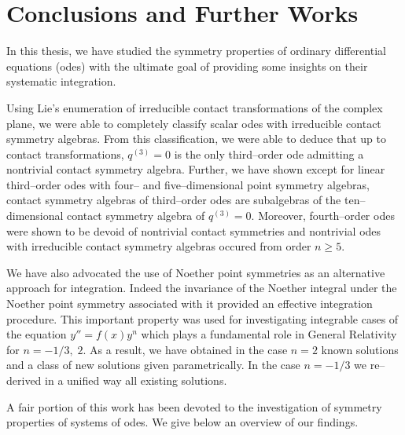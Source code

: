%

\chapter*{Conclusions and Further Works}

In this thesis, we have studied the symmetry properties of
ordinary differential equations (odes) with the ultimate
goal of providing some insights on their systematic integration. 

Using Lie's enumeration of irreducible contact transformations of the complex
plane, we were able to completely classify scalar odes with irreducible
contact symmetry algebras. From this classification, we were able to
deduce that up to
contact transformations, $q^{(3)}=0$ is the only third--order ode admitting
a nontrivial contact symmetry algebra. Further, we have shown except for
linear third--order odes with four-- and  five--dimensional point  symmetry
algebras, contact symmetry algebras of third--order odes are subalgebras of
the
ten--dimensional contact symmetry algebra of $q^{(3)}=0$. Moreover,
fourth--order odes were shown to be devoid of nontrivial contact symmetries
and nontrivial odes with irreducible contact symmetry algebras occured
from order $n \ge 5$. 

We have also advocated the use of Noether point symmetries as an alternative
approach for integration. Indeed the invariance of the Noether integral under
the Noether point symmetry associated with it provided an effective
integration procedure. This important property was used for
investigating integrable cases of the equation $y''=f(x)y^n$ which plays
a fundamental role in General Relativity for $n=-1/3,\;2$.
As a result, we have obtained in the case $n=2$ known solutions and a class
of new solutions given parametrically. In the case $n=-1/3$ we re--derived
in a unified way all existing solutions. 
 
A fair portion of this work has been devoted to the investigation of
symmetry properties of systems of odes. We give below an overview of our
findings. 
 
